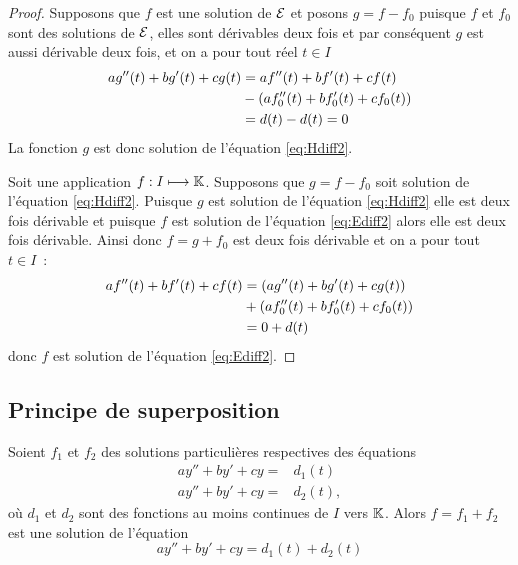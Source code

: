 \begin{proof}
    Supposons que \(f\) est une solution de \(\mathcal{E}\) et posons \(g = f - f_0\) 
    puisque \(f\) et \(f_0\) sont des solutions de \(\mathcal{E}\), elles sont dérivables 
    deux fois et par conséquent \(g\) est aussi dérivable deux fois, et on a 
    pour tout réel \(t \in I\)
    \begin{align}
        ag''(t) + bg'(t) + cg(t) &= af''(t) + bf'(t) + cf(t) \notag\\
                           &- (af_0''(t) + bf_0'(t) + cf_0(t))\\ 
                           &= d(t)-d(t) = 0
    \end{align}
    La fonction \(g\) est donc solution de l'équation \eqref{eq:Hdiff2}.

    Soit une application \(f:I \longmapsto \mathbb{K}\). Supposons que \(g = f-f_0\) 
    soit solution de l'équation \eqref{eq:Hdiff2}. Puisque \(g\) est solution de 
    l'équation \eqref{eq:Hdiff2} elle est deux fois dérivable et puisque \(f\) 
    est solution de l'équation \eqref{eq:Ediff2} alors elle est deux fois 
    dérivable. Ainsi donc \(f = g + f_0\) est deux fois dérivable et on a pour 
    tout \(t \in I\)~:
    \begin{align}
        af''(t) + bf'(t) + cf(t)& = (ag''(t) + bg'(t) + cg(t))\notag\\ 
                                & + (af_0''(t) + bf_0'(t) + cf_0(t))\\ 
                                & = 0 + d(t)
    \end{align}
    donc \(f\) est solution de l'équation \eqref{eq:Ediff2}.
\end{proof}

\subsection{Principe de superposition}

\begin{prop}
    Soient \(f_1\) et \(f_2\) des solutions particulières respectives des équations
    \begin{align}
        ay'' + by' + cy = &d_1(t) \label{eq:EdiffE1}\\ 
        ay'' + by' + cy = &d_2(t) \label{eq:EdiffE2},
    \end{align}
    où \(d_1\) et \(d_2\) sont des fonctions au moins continues de \(I\) vers 
    \(\mathbb{K}\). Alors \(f = f_1 + f_2\) est une solution de l'équation
    \begin{equation}
        \label{eq:EdiffE0}
        ay'' + by' + cy = d_1(t) + d_2(t)
    \end{equation}
\end{prop}

